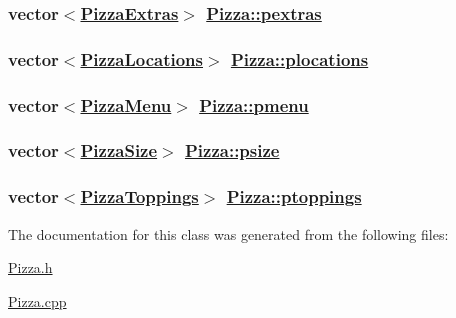 \hypertarget{class_pizza_daa120a92c418c69c30c510e3d6fceb4}{
\subsubsection[pextras]{\setlength{\rightskip}{0pt plus 5cm}vector$<$\hyperlink{class_pizza_extras}{Pizza\-Extras}$>$ \hyperlink{class_pizza_daa120a92c418c69c30c510e3d6fceb4}{Pizza::pextras}}}
\label{class_pizza_daa120a92c418c69c30c510e3d6fceb4}


\hypertarget{class_pizza_4089a0661af312f0d870f8ac9a4bd03c}{
\subsubsection[plocations]{\setlength{\rightskip}{0pt plus 5cm}vector$<$\hyperlink{class_pizza_locations}{Pizza\-Locations}$>$ \hyperlink{class_pizza_4089a0661af312f0d870f8ac9a4bd03c}{Pizza::plocations}}}
\label{class_pizza_4089a0661af312f0d870f8ac9a4bd03c}


\hypertarget{class_pizza_b86f8b99db37aed0b14a52090e90df73}{
\subsubsection[pmenu]{\setlength{\rightskip}{0pt plus 5cm}vector$<$\hyperlink{class_pizza_menu}{Pizza\-Menu}$>$ \hyperlink{class_pizza_b86f8b99db37aed0b14a52090e90df73}{Pizza::pmenu}}}
\label{class_pizza_b86f8b99db37aed0b14a52090e90df73}


\hypertarget{class_pizza_e0615fa3029d85be3e626ed0d6e2f6ae}{
\subsubsection[psize]{\setlength{\rightskip}{0pt plus 5cm}vector$<$\hyperlink{class_pizza_size}{Pizza\-Size}$>$ \hyperlink{class_pizza_e0615fa3029d85be3e626ed0d6e2f6ae}{Pizza::psize}}}
\label{class_pizza_e0615fa3029d85be3e626ed0d6e2f6ae}


\hypertarget{class_pizza_00a8ee0e60c8a0813bd0253e2ce99090}{
\subsubsection[ptoppings]{\setlength{\rightskip}{0pt plus 5cm}vector$<$\hyperlink{class_pizza_toppings}{Pizza\-Toppings}$>$ \hyperlink{class_pizza_00a8ee0e60c8a0813bd0253e2ce99090}{Pizza::ptoppings}}}
\label{class_pizza_00a8ee0e60c8a0813bd0253e2ce99090}




The documentation for this class was generated from the following files:\begin{CompactItemize}
\item 
\hyperlink{_pizza_8h}{Pizza.h}\item 
\hyperlink{_pizza_8cpp}{Pizza.cpp}\end{CompactItemize}

